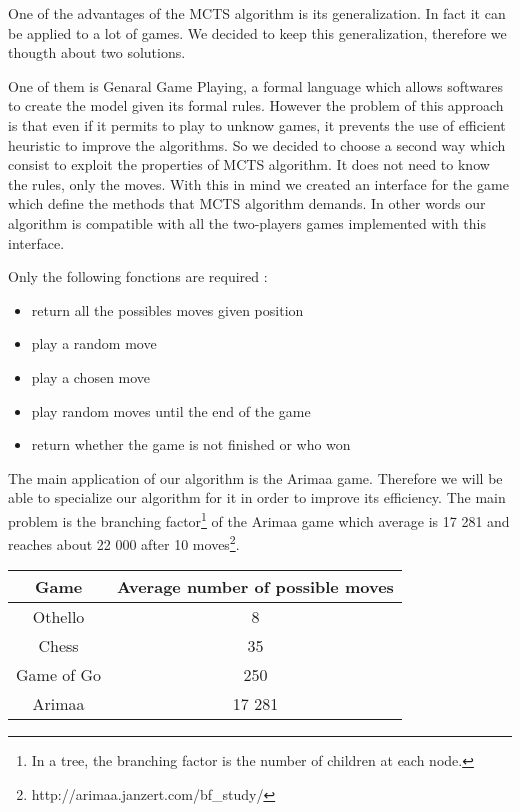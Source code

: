 One of the advantages of the MCTS algorithm is its generalization. In fact it can be applied to a lot of games. We decided to keep this generalization, therefore we thougth about two solutions.

One of them is Genaral Game Playing, a formal language which allows softwares to create the model given its formal rules. However the problem of this approach is that even if it permits to play to unknow games, it prevents the use of efficient heuristic to improve the algorithms.
So we decided to choose a second way which consist to exploit the properties of MCTS algorithm. 
It does not need to know the rules, only the moves. With this in mind we created an interface for the game which define the methods that MCTS algorithm demands. In other words our algorithm is compatible with all the two-players games implemented with this interface.

Only the following fonctions are required : 
\begin{itemize}
\item return all the possibles moves given position
\item play a random move
\item play a chosen move 
\item play random moves until the end of the game
\item return whether the game is not finished or who won
\end{itemize}

The main application of our algorithm is the Arimaa game. Therefore we will be able to specialize our algorithm for it in order to improve its efficiency. The main problem is the branching factor\footnote{In a tree, the branching factor is the number of children at each node.} of the Arimaa game which average is 17 281 and reaches about 22 000 after 10 moves\footnote{http://arimaa.janzert.com/bf\_study/}.\\

\begin{center}
	\begin{tabular}{ | c | c |}
		\hline Game & Average number of possible moves \\ \hline
		\hline  
		Othello & 8\\
		\hline  
		Chess & 35\\
		\hline  
		Game of Go & 250\\
		\hline
		Arimaa & 17 281\\
		\hline
	\end{tabular}
\end{center}


